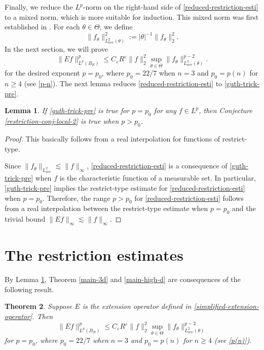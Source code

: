 \documentclass{amsart}
\numberwithin{equation}{section}
\newtheorem{theorem}{Theorem}[section]
\newtheorem{lemma}[theorem]{Lemma}
\newcommand{\e}{\varepsilon}
\begin{document}
\smallskip

Finally, we reduce the $L^p$-norm on the right-hand side of \eqref{reduced-restriction-esti} to a mixed norm, which is more suitable for induction. 
This mixed norm was first established in \cite{Guth-R3}.
For each $\theta\in\Theta$, we define 
\begin{equation}
    \|f_\theta\|_{L^2_{ave}(\theta)}^2:=|\theta|^{-1}\|f_\theta\|_2^2.
\end{equation}
In the next section, we will prove
\begin{equation}
\label{guth-trick-pre}
    \|E f\|_{L^p(B_R)}^p\leq C_\e R^\e \|f\|_2^2\sup_{\theta\in\Theta}\|f_\theta\|_{L^2_{ave}(\theta)}^{p-2}.
\end{equation}
for the desired exponent $p=p_0$, where $p_0=22/7$ when $n=3$ and $p_0=p(n)$ for $n\geq4$ (see \eqref{p-n}). 
The next lemma reduces \eqref{reduced-restriction-esti} to \eqref{guth-trick-pre}.

\begin{lemma}
\label{real-interpolation}
If \eqref{guth-trick-pre} is true for $p=p_0$ for any $f\in L^p$, then Conjecture \ref{restriction-conj-local-2} is true when $p>p_0$.
\end{lemma}
\begin{proof}
This basically follows from a real interpolation for functions of restrict-type.

Since $\|f_\theta\|_{L^2_{ave}}\lesssim\|f\|_\infty$, \eqref{reduced-restriction-esti} is a consequence of \eqref{guth-trick-pre} when $f$ is the characteristic function of a measurable set. 
In particular, \eqref{guth-trick-pre} implies the restrict-type estimate for \eqref{reduced-restriction-esti} when $p=p_0$. 
Therefore, the range $p>p_0$ for \eqref{reduced-restriction-esti} follows from  a real interpolation between the restrict-type estimate when $p=p_0$ and the trivial bound $\|Ef\|_\infty \lesssim\|f\|_\infty$.
\end{proof}



\bigskip


\section{The restriction estimates} \label{section: restriction estimates}

By Lemma \ref{real-interpolation}, Theorem \ref{main-3d} and \ref{main-high-d} are consequences of the following result.
\begin{theorem}
\label{main-thm-reduction}
Suppose $E$ is the extension operator defined in \eqref{simplified-extension-operator}. 
Then 
\begin{equation}
\label{guth-trick}
    \|E f\|_{L^p(B_R)}^p\leq C_\e R^\e \|f\|_2^2\sup_{\theta\in\Theta}\|f_\theta\|_{L^2_{ave}(\theta)}^{p-2}
\end{equation}
for $p=p_0$, where $p_0=22/7$ when $n=3$ and $p_0=p(n)$ for $n\geq4$ (see \eqref{p(n)}). 
\end{theorem}
\end{document}
